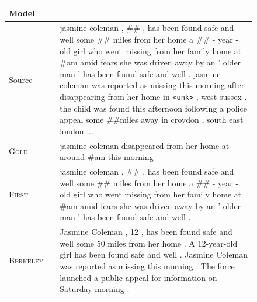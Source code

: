 \documentclass[12pt]{report}
\begin{document}
\begin{figure}[p]
\centering
\begin{tabular}{ll p{}}
\toprule
Model & & \\
\midrule
Source & & jasmine coleman , \#\# , has been found safe and well some \#\# miles from her home a \#\# - year - old girl who went missing from her family home at \#am amid fears she was driven away by an ' older man ' has been found safe and well . jasmine coleman was reported as missing this morning after disappearing from her home in \texttt{<unk>} , west sussex . the child was found this afternoon following a police appeal some \#\#miles away in croydon , south east london ... \\
\midrule
\textsc{Gold} & & jasmine coleman disappeared from her home at around \#am this morning \\
\midrule
\textsc{First} & & jasmine coleman , \#\# , has been found safe and well some \#\# miles from her home a \#\# - year - old girl who went missing from her family home at \#am amid fears she was driven away by an ' older man ' has been found safe and well . \\
\midrule
\textsc{Berkeley} & & Jasmine Coleman , 12 , has been found safe and well some 50 miles from her home . A 12-year-old girl has been found safe and well . Jasmine Coleman was reported as missing this morning . The force launched a public appeal for information on Saturday morning . \\
\midrule


\end{tabular}
\end{figure}
\end{document}
